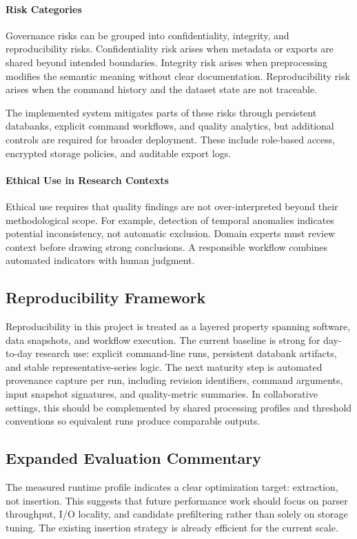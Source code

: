 \paragraph{Risk Categories}
Governance risks can be grouped into confidentiality, integrity, and reproducibility risks. Confidentiality risk arises when metadata or exports are shared beyond intended boundaries. Integrity risk arises when preprocessing modifies the semantic meaning without clear documentation. Reproducibility risk arises when the command history and the dataset state are not traceable.

The implemented system mitigates parts of these risks through persistent databanks, explicit command workflows, and quality analytics, but additional controls are required for broader deployment. These include role-based access, encrypted storage policies, and auditable export logs.

\paragraph{Ethical Use in Research Contexts}
Ethical use requires that quality findings are not over-interpreted beyond their methodological scope. For example, detection of temporal anomalies indicates potential inconsistency, not automatic exclusion. Domain experts must review context before drawing strong conclusions. A responsible workflow combines automated indicators with human judgment.

\subsection{Reproducibility Framework}
Reproducibility in this project is treated as a layered property spanning software, data snapshots, and workflow execution. The current baseline is strong for day-to-day research use: explicit command-line runs, persistent databank artifacts, and stable representative-series logic. The next maturity step is automated provenance capture per run, including revision identifiers, command arguments, input snapshot signatures, and quality-metric summaries. In collaborative settings, this should be complemented by shared processing profiles and threshold conventions so equivalent runs produce comparable outputs.

\subsection{Expanded Evaluation Commentary}
The measured runtime profile indicates a clear optimization target: extraction, not insertion. This suggests that future performance work should focus on parser throughput, I/O locality, and candidate prefiltering rather than solely on storage tuning. The existing insertion strategy is already efficient for the current scale.

